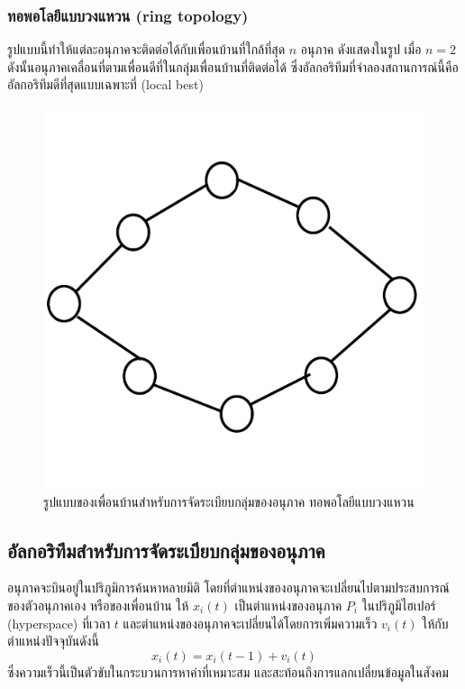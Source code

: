 \subsubsection{ทอพอโลยีแบบวงแหวน (ring topology)}
รูปแบบนี้ทำให้แต่ละอนุภาคจะติดต่อได้กับเพื่อนบ้านที่ใกล้ที่สุด \(n\) อนุภาค ดังแสดงในรูป เมื่อ \(n=2\) ดังนั้นอนุภาคเคลื่อนที่ตามเพื่อนดีที่ในกลุ่มเพื่อนบ้านที่ติดต่อได้ ซึ่งอัลกอริทึมที่จำลองสถานการณ์นี้คือ อัลกอริทึมดีที่สุดแบบเฉพาะที่ (local best)
\begin{figure}[ht]
    \centering
    \includegraphics[scale=0.3]{images/ring_topology.png}
    \caption{รูปแบบของเพื่อนบ้านสำหรับการจัดระเบียบกลุ่มของอนุภาค ทอพอโลยีแบบวงแหวน}
    \label{fig:9}
\end{figure}

\subsection{อัลกอริทึมสำหรับการจัดระเบียบกลุ่มของอนุภาค}
อนุภาคจะบินอยู่ในปริภูมิการค้นหาหลายมิติ โดยที่ตำแหน่งของอนุภาคจะเปลี่ยนไปตามประสบการณ์ของตัวอนุภาคเอง หรือของเพื่อนบ้าน ให้ \(x_{i}(t)\) เป็นตำแหน่งของอนุภาค \(P_{i}\) ในปริภูมิไฮเปอร์ (hyperspace) ที่เวลา \(t\) และตำแหน่งของอนุภาคจะเปลี่ยนได้โดยการเพิ่มความเร็ว \(v_{i}(t)\) ให้กับตำแหน่งปัจจุบันดังนี้
\begin{equation}
  x_{i}(t) = x_{i}(t-1)+v_{i}(t)
\end{equation}
ซึ่งความเร็วนี้เป็นตัวขับในกระบวนการหาค่าที่เหมาะสม และสะท้อนถึงการแลกเปลี่ยนข้อมูลในสังคม
